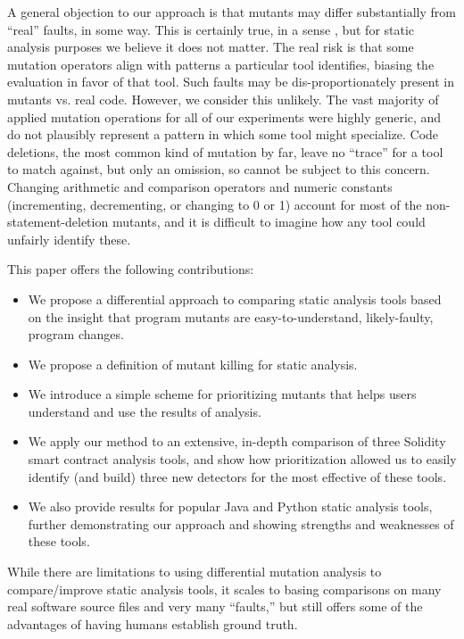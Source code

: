 A general objection to our approach is that mutants may differ substantially from ``real'' faults, in some way.  This is certainly true, in a sense \cite{GopinathMutants}, but for static analysis purposes we believe it does not matter.   The real risk is that some mutation operators align with patterns a particular tool identifies, biasing the evaluation in favor of that tool.  Such faults may be dis-proportionately present in mutants vs. real code.  However, we consider this unlikely.  The vast majority of applied mutation operations for all of our experiments were highly generic, and do not plausibly represent a pattern in which some tool might specialize.  Code deletions, the most common kind of mutation by far, leave no ``trace'' for a tool to match against, but only an omission, so cannot be subject to this concern.  Changing arithmetic and comparison operators and numeric constants (incrementing, decrementing, or changing to 0 or 1) account for most of the non-statement-deletion mutants, and it is difficult to imagine how any tool could unfairly identify these.


This paper offers the following contributions:

\begin{itemize}[labelsep=3pt,leftmargin=12pt]
\item We propose a differential approach to comparing static analysis tools based on the insight that program mutants are easy-to-understand, likely-faulty, program changes.
\item We propose a definition of mutant killing for static analysis.
\item We introduce a simple scheme for prioritizing mutants that helps users understand and use the results of analysis.
\item We apply our method to an extensive, in-depth comparison of three Solidity smart contract analysis tools, and show how prioritization allowed us to easily identify (and build) three new detectors for the most effective of these tools.
\item We also provide results for popular Java and Python static analysis tools, further demonstrating our approach and showing strengths and weaknesses of these tools.
\end{itemize}

 While there are limitations to using differential mutation analysis to compare/improve static analysis tools, it scales to basing comparisons on many real software source files and very many ``faults,'' but still offers some of the advantages of having humans establish ground truth.

